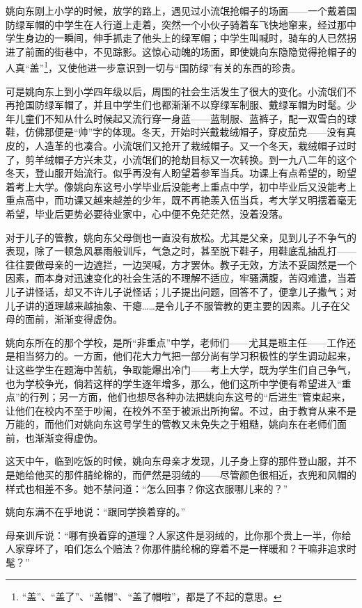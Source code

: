 \par 姚向东刚上小学的时候，放学的路上，遇见过小流氓抢帽子的场面——一个戴着国防绿军帽的中学生在人行道上走着，突然一个小伙子骑着车飞快地窜来，经过那中学生身边的一瞬间，伸手抓走了他头上的绿军帽；中学生叫喊时，骑车的人已然拐进了前面的街巷中，不见踪影。这惊心动魄的场面，即使姚向东隐隐觉得抢帽子的人真“盖”\footnote{“盖”、“盖了”、“盖帽”、“盖了帽啦”，都是了不起的意思。}，又使他进一步意识到一切与“国防绿”有关的东西的珍贵。
\par 可是姚向东上到小学四年级以后，周围的社会生活发生了很大的变化。小流氓们不再抢国防绿军帽了，并且中学生们也都渐渐不以穿绿军制服、戴绿军帽为时髦。少年儿童们不知从什么时候起又流行穿一身蓝——蓝制服、蓝裤子，配一双雪白的球鞋，仿佛那便是“帅”字的体现。冬天，开始时兴戴栽绒帽子，穿皮茄克——没有真皮的，人造革的也凑合。小流氓们又抢开了栽绒帽子。又一个冬天，栽绒帽子过时了，剪羊绒帽子方兴未艾，小流氓们的抢劫目标又一次转换。到一九八二年的这个冬天，登山服开始流行。似乎再没有人盼望着参军当兵。功课上有点希望的，盼望着考上大学。像姚向东这号小学毕业后没能考上重点中学，初中毕业后又没能考上重点高中，而功课又越来越差的少年，既不再艳羡入伍当兵，考大学又明摆着毫无希望，毕业后更势必要待业家中，心中便不免茫茫然，没着没落。
\par 对于儿子的管教，姚向东父母倒也一直没有放松。尤其是父亲，见到儿子不争气的表现，除了一顿急风暴雨般训斥，气急之时，甚至脱下鞋子，用鞋底乱抽乱打——往往要做母亲的一边遮拦，一边哭喊，方才罢休。教子无效，方法不妥固然是一个因素，而本身对迅速变化的社会生活的不理解不适应，牢骚满腹，苦闷难遣，当着儿子讲怪话，却又不许儿子说怪话；儿子提出问题，回答不了，便拿儿子撒气；对儿子讲的道理越来越抽象、干瘪……是令儿子不服管教的更主要的因素。儿子在父母的面前，渐渐变得虚伪。
\par 姚向东所在的那个学校，是所“非重点”中学，老师们——尤其是班主任——工作还是相当努力的。一方面，他们花大力气把一部分尚有学习积极性的学生调动起来，让这些学生在题海中苦航，争取能爆出冷门——考上大学，既为学生们自己争气，也为学校争光，倘若这样的学生逐年增多，那么，他们这所中学便有希望进入“重点”的行列；另一方面，他们也想尽各种办法把姚向东这号的“后进生”管束起来，让他们在校内不至于吵闹，在校外不至于被派出所拘留。不过，由于教育从来不是万能的，而他们对姚向东这号学生的管教又未免失之于粗糙，姚向东在老师们面前，也渐渐变得虚伪。
\par 这天中午，临到吃饭的时候，姚向东母亲才发现，儿子身上穿的那件登山服，并不是她给他买的那件腈纶棉的，而俨然是羽绒的——尽管颜色很相近，衣兜和风帽的样式也相差不多。她不禁问道：“怎么回事？你这衣服哪儿来的？”
\par 姚向东满不在乎地说：“跟同学换着穿的。”
\par 母亲训斥说：“哪有换着穿的道理？人家这件是羽绒的，比你那个贵上一半，你给人家穿坏了，咱们怎么个赔法？你那件腈纶棉的穿着不是一样暖和？干嘛非追求时髦？”
